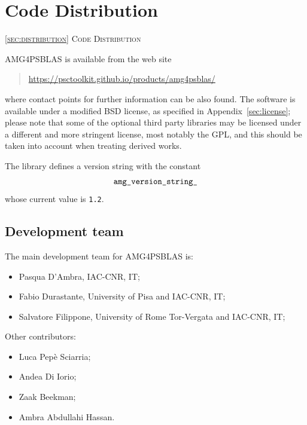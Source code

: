 \section{Code Distribution\label{sec:distribution}}
         {\textsc{\ref{sec:distribution} Code Distribution}}

\noindent
AMG4PSBLAS is available from the web site
\begin{quotation}
\href{https://psctoolkit.github.io/products/amg4psblas/}{https://psctoolkit.github.io/products/amg4psblas/}
\end{quotation}
where contact points for further information can be also found.
The software is available under a modified BSD license, as specified
in Appendix~\ref{sec:license}; please note that some of the optional
third party libraries may be licensed under a different and more
stringent license, most notably the GPL, and this should be taken into
account when treating derived works.

The library defines a version string with the
constant
\[ \verb|amg_version_string_|\]
whose current value is \verb|1.2|.

\subsection*{Development team}
The main development team for AMG4PSBLAS is:
\begin{itemize}
\item Pasqua D'Ambra, IAC-CNR, IT;			
\item Fabio Durastante, University of Pisa and IAC-CNR, IT;
\item Salvatore  Filippone, University of Rome Tor-Vergata and IAC-CNR, IT;	
\end{itemize}
Other contributors:
\begin{center}
  \begin{minipage}{.48\textwidth}
    \begin{itemize}
    \item Luca       Pepè Sciarria;
    \item Andea      Di Iorio;
    \end{itemize}
  \end{minipage}
  \hfill
  \begin{minipage}{.48\textwidth}
    \begin{itemize}
    \item Zaak       Beekman;
    \item Ambra      Abdullahi Hassan.
    \end{itemize}
  \end{minipage}
\end{center}
